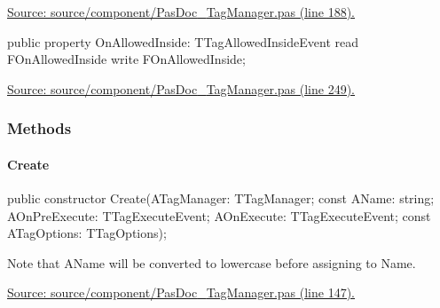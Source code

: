 \documentclass{report}
\newif\ifpdf
\begin{document}
\begin{list}{}
\begin{flushleft}
\ifpdf
\end{flushleft}
\fi


\par  \par
\href{https://github.com/pasdoc/pasdoc/blob/master/source/component/PasDoc_TagManager.pas#L188}{Source: source/component/PasDoc{\_}TagManager.pas (line 188).}\label{PasDoc_TagManager.TTag-OnAllowedInside}
\item[\textbf{OnAllowedInside}\hfill]
\ifpdf
\begin{flushleft}
\fi
\begin{ttfamily}
public property OnAllowedInside: TTagAllowedInsideEvent
      read FOnAllowedInside write FOnAllowedInside;\end{ttfamily}

\ifpdf
\end{flushleft}
\fi


\par  \par
\href{https://github.com/pasdoc/pasdoc/blob/master/source/component/PasDoc_TagManager.pas#L249}{Source: source/component/PasDoc{\_}TagManager.pas (line 249).}\end{list}
\subsubsection*{\large{\textbf{Methods}}\normalsize\hspace{1ex}\hfill}
\paragraph*{Create}\hspace*{\fill}

\label{PasDoc_TagManager.TTag-Create}
\begin{list}{}{
\setlength{\itemindent}{0cm}
\setlength{\listparindent}{0cm}
\setlength{\leftmargin}{\evensidemargin}
\addtolength{\leftmargin}{\tmplength}
\settowidth{\labelsep}{X}
\addtolength{\leftmargin}{\labelsep}
\setlength{\labelwidth}{\tmplength}
}
\item[\textbf{Declaration}\hfill]
\ifpdf
\begin{flushleft}
\fi
\begin{ttfamily}
public constructor Create(ATagManager: TTagManager; const AName: string; AOnPreExecute: TTagExecuteEvent; AOnExecute: TTagExecuteEvent; const ATagOptions: TTagOptions);\end{ttfamily}

\ifpdf
\end{flushleft}
\fi

\par
\item[\textbf{Description}]
Note that AName will be converted to lowercase before assigning to Name.\par
\href{https://github.com/pasdoc/pasdoc/blob/master/source/component/PasDoc_TagManager.pas#L147}{Source: source/component/PasDoc{\_}TagManager.pas (line 147).}

\end{list}
\end{document}
